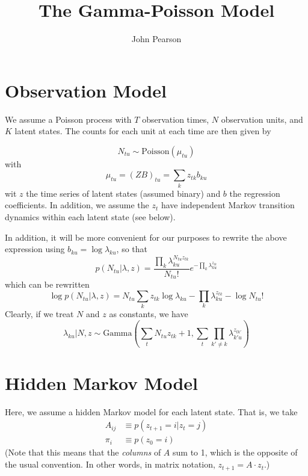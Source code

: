 \documentclass[11pt]{article}
\begin{document}
\title{The Gamma-Poisson Model}
\author{John Pearson}
\maketitle

\section{Observation Model}
We assume a Poisson process with $T$ observation times, $N$ observation units, and $K$ latent states. The counts for each unit at each time are then given by 

\begin{equation}
    N_{tu} \sim \mathrm{Poisson}(\mu_{tu})    
\end{equation}
with 
\begin{equation}
   \mu_{tu} = (ZB)_{tu} = \sum_k z_{tk} b_{ku} 
\end{equation}
wit $z$ the time series of latent states (assumed binary) and $b$ the regression coefficients. In addition, we assume the $z_t$ have independent Markov transition dynamics within each latent state (see below).

In addition, it will be more convenient for our purposes to rewrite the above expression using $b_{ku} = \log \lambda_{ku}$, so that 
\begin{equation}
    p(N_{tu}|\lambda, z) = \frac{\prod_k \lambda_{ku}^{N_{tu} z_{tk}}}{N_{tu}!} e^{-\prod_k \lambda_{ku}^{z_{tk}}}
\end{equation}
which can be rewritten
\begin{equation}
    \log p(N_{tu}|\lambda, z) = N_{tu} \sum_k z_{tk} \log \lambda_{ku} - \prod_k \lambda_{ku}^{z_{tk}} - \log N_{tu}!
\end{equation}
Clearly, if we treat $N$ and $z$ as constants, we have
\begin{equation}
    \lambda_{ku}|N, z \sim \mathrm{Gamma}(\sum_t N_{tu}z_{tk} + 1, \sum_t\prod_{k'\neq k} \lambda_{k'u}^{z_{tk'}})
\end{equation}

\section{Hidden Markov Model}
Here, we assume a hidden Markov model for each latent state. That is, we take
\begin{align}
    A_{ij} &\equiv p(z_{t+1}=i|z_t = j) \\
    \pi_i &\equiv p(z_0 = i)
\end{align}
(Note that this means that the \emph{columns} of $A$ sum to 1, which is the opposite of the usual convention. In other words, in matrix notation, $z_{t+1} = A \cdot z_t$.)
\end{document}
